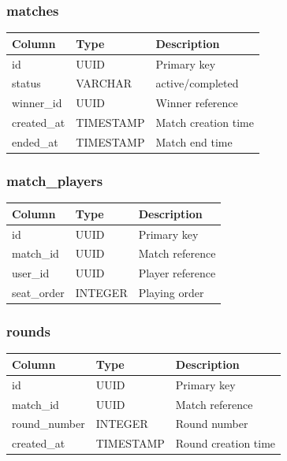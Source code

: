 \documentclass[11pt,a4paper]{article}
\begin{document}

\subsubsection{matches}

\begin{longtable}{|p{4cm}|p{4cm}|p{5cm}|}
\hline
Column & Type & Description \\
\hline
id & UUID & Primary key \\
\hline
status & VARCHAR & active/completed \\
\hline
winner\_id & UUID & Winner reference \\
\hline
created\_at & TIMESTAMP & Match creation time \\
\hline
ended\_at & TIMESTAMP & Match end time \\
\hline
\end{longtable}


\subsubsection{match\_players}

\begin{longtable}{|p{4cm}|p{4cm}|p{5cm}|}
\hline
Column & Type & Description \\
\hline
id & UUID & Primary key \\
\hline
match\_id & UUID & Match reference \\
\hline
user\_id & UUID & Player reference \\
\hline
seat\_order & INTEGER & Playing order \\
\hline
\end{longtable}


\subsubsection{rounds}

\begin{longtable}{|p{4cm}|p{4cm}|p{5cm}|}
\hline
Column & Type & Description \\
\hline
id & UUID & Primary key \\
\hline
match\_id & UUID & Match reference \\
\hline
round\_number & INTEGER & Round number \\
\hline
created\_at & TIMESTAMP & Round creation time \\
\hline
\end{longtable}
\end{document}
